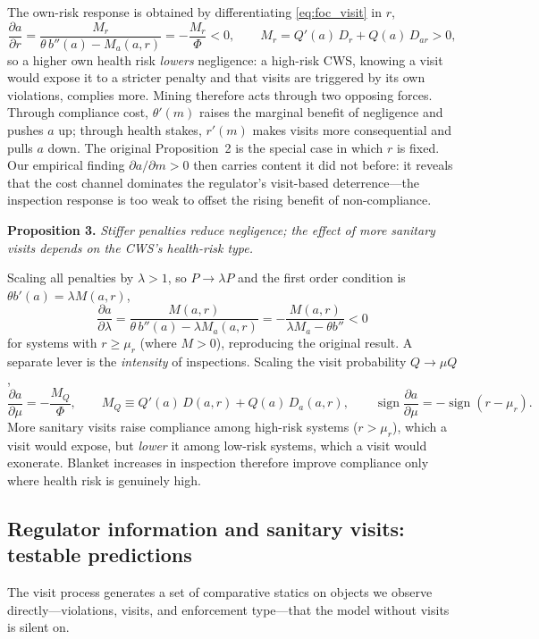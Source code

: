 \documentclass{article}
\begin{document}
The own-risk response is obtained by differentiating \eqref{eq:foc_visit} in $r$,
\[
\frac{\partial a}{\partial r} = \frac{M_r}{\theta\, b''(a) - M_a(a,r)} = -\frac{M_r}{\Phi} < 0, \qquad M_r = Q'(a)\,D_r + Q(a)\,D_{ar} > 0 ,
\]
so a higher own health risk \emph{lowers} negligence: a high-risk CWS, knowing a visit would expose it to a stricter penalty and that visits are triggered by its own violations, complies more. Mining therefore acts through two opposing forces. Through compliance cost, $\theta'(m)$ raises the marginal benefit of negligence and pushes $a$ up; through health stakes, $r'(m)$ makes visits more consequential and pulls $a$ down. The original Proposition~2 is the special case in which $r$ is fixed. Our empirical finding $\partial a/\partial m > 0$ then carries content it did not before: it reveals that the cost channel dominates the regulator's visit-based deterrence---the inspection response is too weak to offset the rising benefit of non-compliance.

\medskip
\noindent\textbf{Proposition 3.} \emph{Stiffer penalties reduce negligence; the effect of more sanitary visits depends on the CWS's health-risk type.}

Scaling all penalties by $\lambda>1$, so $P \to \lambda P$ and the first order condition is $\theta b'(a) = \lambda M(a,r)$,
\[
\frac{\partial a}{\partial\lambda} = \frac{M(a,r)}{\theta\, b''(a) - \lambda M_a(a,r)} = -\frac{M(a,r)}{\lambda M_a - \theta b''} < 0
\]
for systems with $r \ge \mu_r$ (where $M>0$), reproducing the original result. A separate lever is the \emph{intensity} of inspections. Scaling the visit probability $Q \to \mu Q$,
\[
\frac{\partial a}{\partial\mu} = -\frac{M_Q}{\Phi}, \qquad M_Q \equiv Q'(a)\,D(a,r) + Q(a)\,D_a(a,r), \qquad \operatorname{sign}\frac{\partial a}{\partial\mu} = -\operatorname{sign}(r-\mu_r) .
\]
More sanitary visits raise compliance among high-risk systems ($r>\mu_r$), which a visit would expose, but \emph{lower} it among low-risk systems, which a visit would exonerate. Blanket increases in inspection therefore improve compliance only where health risk is genuinely high.

\subsection{Regulator information and sanitary visits: testable predictions}

The visit process generates a set of comparative statics on objects we observe directly---violations, visits, and enforcement type---that the model without visits is silent on.
\end{document}
